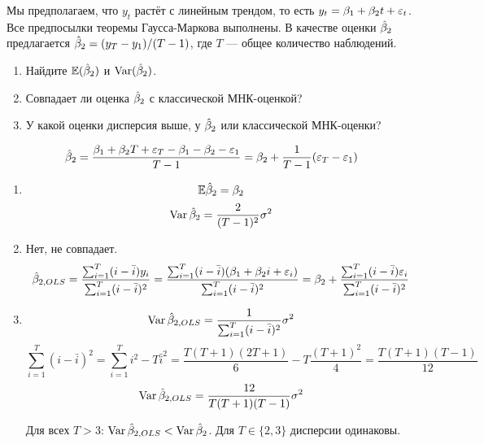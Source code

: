 \begin{problem}
Мы предполагаем, что $y_t$ растёт с линейным трендом, то есть $y_t=\beta_1+\beta_2 t+\varepsilon_t$. Все предпосылки теоремы Гаусса-Маркова выполнены. В качестве оценки $\hat{\beta}_2$ предлагается $\hat{\beta}_2=(y_T-y_1)/(T-1)$, где $T$ — общее количество наблюдений.
\begin{enumerate}
\item Найдите $\mathbb{E}(\hat{\beta}_2)$ и $\operatorname{Var}(\hat{\beta}_2)$.
\item Совпадает ли оценка $\hat{\beta}_2$ с классической МНК-оценкой?
\item У какой оценки дисперсия выше, у $\hat{\beta}_2$ или классической МНК-оценки?
\end{enumerate}


\begin{sol}
\[\hat{\beta}_2 = \frac{\beta_1 + \beta_2 T + \varepsilon_T - \beta_1 - \beta_2 - \varepsilon_1}{T - 1} = \beta_2 + \frac{1}{T-1} (\varepsilon_T - \varepsilon_1) \]

\begin{enumerate}
\item \[\mathbb{E} \hat{\beta}_2 = \beta_2 \]
\[ \operatorname{Var} \hat{\beta}_2 = \frac{2}{(T - 1)^2} \sigma^2   \]
\item Нет, не совпадает.
\[ \hat{\beta}_{2,OLS} = \frac{\sum_{i = 1}^T (i - \bar{i}) y_i}{\sum_{i = 1}^T (i - \bar{i})^2} = \frac{\sum_{i = 1}^T (i - \bar{i}) (\beta_1 + \beta_2 i + \varepsilon_i)}{\sum_{i = 1}^T (i - \bar{i})^2} = \beta_2 + \frac{\sum_{i = 1}^T (i - \bar{i}) \varepsilon_i}{\sum_{i = 1}^T (i - \bar{i})^2}\]
\item \[\operatorname{Var}\hat{\beta}_{2,OLS} = \frac{1}{\sum_{i = 1}^T (i - \bar{i})^2} \sigma^2   \]
\[ \sum_{i = 1}^T (i - \bar{i})^2 = \sum_{i = 1}^T i^2 - T \bar{i}^2 = \frac{T(T+1)(2T+1)}{6} - T \frac{(T+1)^2}{4} = \frac{T(T+1)(T-1)}{12} \]
\[ \operatorname{Var}\hat{\beta}_{2,OLS} = \frac{12}{T(T+1)(T-1)} \sigma^2\]

Для всех \(T > 3\): \(\operatorname{Var}\hat{\beta}_{2,OLS} < \operatorname{Var}\hat{\beta}_{2}\). Для \(T \in \{2, 3\}\) дисперсии одинаковы.
\end{enumerate}

\end{sol}
\end{problem}



